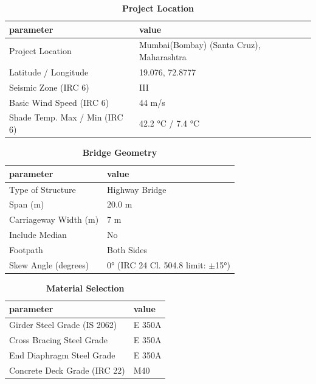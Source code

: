\documentclass[12pt,a4paper]{report}
\numberwithin{table}{chapter}
\numberwithin{figure}{chapter}
\begin{document}
\begin{table}[H]
\caption{\textbf{Project Location}}
\label{subsec:project-location}
\begin{tabular}{|L{5.5cm}|L{8.5cm}|}
\hline
\textbf{parameter} & \textbf{value} \\
\hline
\textnormal{Project Location} & Mumbai(Bombay) (Santa Cruz), Maharashtra \\
\hline
\textnormal{Latitude / Longitude} & 19.076, 72.8777 \\
\hline
\textnormal{Seismic Zone (IRC 6)} & III \\
\hline
\textnormal{Basic Wind Speed (IRC 6)} & 44 m/s \\
\hline
\textnormal{Shade Temp. Max / Min (IRC 6)} & 42.2 °C / 7.4 °C \\
\hline
\end{tabular}
\vspace{0.4cm}
\end{table}

\begin{table}[H]
\caption{\textbf{Bridge Geometry}}
\label{subsec:bridge-geometry}
\begin{tabular}{|L{5.5cm}|L{8.5cm}|}
\hline
\textbf{parameter} & \textbf{value} \\
\hline
\textnormal{Type of Structure} & Highway Bridge \\
\hline
\textnormal{Span (m)} & 20.0 m \\
\hline
\textnormal{Carriageway Width (m)} & 7 m \\
\hline
\textnormal{Include Median} & No \\
\hline
\textnormal{Footpath} & Both Sides \\
\hline
\textnormal{Skew Angle (degrees)} & 0° (IRC 24 Cl. 504.8 limit: $\pm$15°) \\
\hline
\end{tabular}
\end{table}
\vspace{0.4cm}

\begin{table}[H]
\caption{\textbf{Material Selection}}
\label{subsec:material}
\begin{tabular}{|L{5.5cm}|L{8.5cm}|}
\hline
\textbf{parameter} & \textbf{value} \\
\hline
\textnormal{Girder Steel Grade (IS 2062)} & E 350A \\
\hline
\textnormal{Cross Bracing Steel Grade} & E 350A \\
\hline
\textnormal{End Diaphragm Steel Grade} & E 350A \\
\hline
\textnormal{Concrete Deck Grade (IRC 22)} & M40 \\
\hline
\end{tabular}
\end{table}
\vspace{0.4cm}
\end{document}
